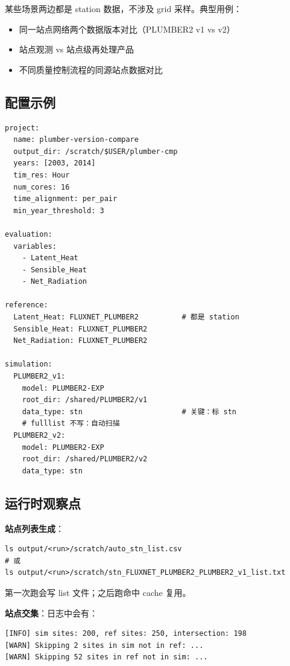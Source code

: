某些场景两边都是 station 数据，不涉及 grid 采样。典型用例：

\begin{itemize}
  \item 同一站点网络两个数据版本对比（PLUMBER2 v1 vs v2）
  \item 站点观测 vs 站点级再处理产品
  \item 不同质量控制流程的同源站点数据对比
\end{itemize}

\subsection{配置示例}

\begin{verbatim}
project:
  name: plumber-version-compare
  output_dir: /scratch/$USER/plumber-cmp
  years: [2003, 2014]
  tim_res: Hour
  num_cores: 16
  time_alignment: per_pair
  min_year_threshold: 3

evaluation:
  variables:
    - Latent_Heat
    - Sensible_Heat
    - Net_Radiation

reference:
  Latent_Heat: FLUXNET_PLUMBER2          # 都是 station
  Sensible_Heat: FLUXNET_PLUMBER2
  Net_Radiation: FLUXNET_PLUMBER2

simulation:
  PLUMBER2_v1:
    model: PLUMBER2-EXP
    root_dir: /shared/PLUMBER2/v1
    data_type: stn                       # 关键：标 stn
    # fulllist 不写：自动扫描
  PLUMBER2_v2:
    model: PLUMBER2-EXP
    root_dir: /shared/PLUMBER2/v2
    data_type: stn
\end{verbatim}

\subsection{运行时观察点}

\textbf{站点列表生成}：

\begin{verbatim}
ls output/<run>/scratch/auto_stn_list.csv
# 或
ls output/<run>/scratch/stn_FLUXNET_PLUMBER2_PLUMBER2_v1_list.txt
\end{verbatim}

第一次跑会写 list 文件；之后跑命中 cache 复用。

\textbf{站点交集}：日志中会有：

\begin{verbatim}
[INFO] sim sites: 200, ref sites: 250, intersection: 198
[WARN] Skipping 2 sites in sim not in ref: ...
[WARN] Skipping 52 sites in ref not in sim: ...
\end{verbatim}

